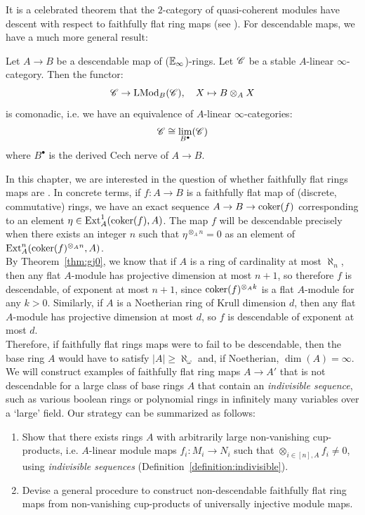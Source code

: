It is a celebrated theorem that the $2$-category of quasi-coherent modules have descent with respect to faithfully flat ring maps (see \cite[Tag0306]{sp}).
For descendable maps, we have a much more general result:
\begin{theorem}\label{thm:luriedescend}
Let $A \to B$ be a descendable map of ($\mathbb{E}_{\infty}$)-rings. Let $\mathscr{C}$ be a stable $A$-linear $\infty$-category. Then the functor:
\[\mathscr{C} \rightarrow \mathrm{LMod}_{B}(\mathscr{C}), \quad X \mapsto B \otimes_A X\]
is comonadic, i.e. we have an equivalence of $A$-linear $\infty$-categories:
\[\mathscr{C} \cong \operatorname*{lim}_{B^{\bullet}}(\mathscr{C})\]
where $B^{\bullet}$ is the derived Cech nerve of $A \to B$. \cite[D.3.4.1]{LurieSAG}
\end{theorem}
In this chapter, we are interested in the question of whether faithfully flat rings maps are . 
In concrete terms, if $f: A \to B$ is a faithfully flat map of (discrete, commutative) rings, we have an exact sequence $A \rightarrow B \rightarrow \operatorname{coker}(f)$ 
corresponding to an element $\eta \in \operatorname{Ext}_A^{1}(\operatorname{coker}(f), A)$. The map $f$ will be descendable precisely when there exists an 
integer $n$ such that $\eta^{\otimes_A n}=0$ as an element of $\operatorname{Ext}^n_A(\operatorname{coker}(f)^{\otimes_A n}, A)$.\\
\indent By Theorem~\ref{thm:gj0}, we know that if $A$ is a ring of cardinality at most $\aleph_n$, then any flat $A$-module has projective dimension at most $n+1$,
so therefore $f$ is descendable, of exponent at most $n+1$, since $\operatorname{coker}(f)^{\otimes_A k}$ is a flat $A$-module for any $k > 0$. 
Similarly, if $A$ is a Noetherian ring of Krull dimension $d$, then any flat $A$-module has projective dimension at most $d$,
so $f$ is descendable of exponent at most $d$.\\
\indent Therefore, if faithfully flat rings maps were to fail to be descendable, then the base ring $A$ would have to satisfy $|A| \ge \aleph_{\omega}$ and, 
if Noetherian, $\dim(A) =\infty$. We will construct examples of faithfully flat ring maps $A \to A'$ that is not descendable for a large
class of base rings $A$ that contain an \textit{indivisible sequence}, such as various boolean rings or polynomial rings in infinitely many variables over a `large' field. 
Our strategy can be summarized as follows:
\begin{enumerate}
\item[(i)] Show that there exists rings $A$ with arbitrarily large non-vanishing cup-products, 
i.e. $A$-linear module maps $f_i: M_i \to N_i$ such that $\otimes_{i\in [n],A} f_i \neq 0$, 
using \textit{indivisible sequences} (Definition~\ref{definition:indivisible}).
\item[(ii)] Devise a general procedure to construct non-descendable faithfully flat ring maps from non-vanishing cup-products of universally
injective module maps.
\end{enumerate}
